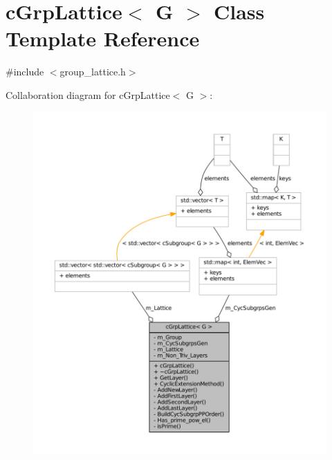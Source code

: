 \hypertarget{classcGrpLattice}{\section{c\-Grp\-Lattice$<$ \-G $>$ \-Class \-Template \-Reference}
\label{classcGrpLattice}
}


{\ttfamily \#include $<$group\-\_\-lattice.\-h$>$}



\-Collaboration diagram for c\-Grp\-Lattice$<$ \-G $>$\-:
\nopagebreak
\begin{figure}[H]
\begin{center}
\leavevmode
\includegraphics[width=350pt]{classcGrpLattice__coll__graph}
\end{center}
\end{figure}
